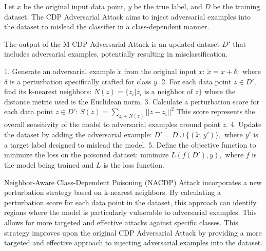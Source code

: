 Let \( x \) be the original input data point, \( y \) be the true label, and \( D \) be the training dataset. The CDP Adversarial Attack aims to inject adversarial examples into the dataset to mislead the classifier in a class-dependent manner.

The output of the M-CDP Adversarial Attack is an updated dataset \( D' \) that includes adversarial examples, potentially resulting in misclassification.

1. Generate an adversarial example \( \tilde{x} \) from the original input \( x \):
   $
   \tilde{x} = x + \delta,
   $
   where \( \delta \) is a perturbation specifically crafted for class \( y \).
2. For each data point \( z \in D' \), find its k-nearest neighbors:
   $
   N(z) = \{z_i | z_i \text{ is a neighbor of } z\}
   $
   where the distance metric used is the Euclidean norm.
3. Calculate a perturbation score for each data point \( z \in D' \):
   $
   S(z) = \sum_{z_i \in N(z)} ||z - z_i||^2
   $
   This score represents the overall sensitivity of the model to adversarial examples around point \( z \).
4. Update the dataset by adding the adversarial example:
   $
   D' = D \cup \{(\tilde{x}, y')\},
   $
   where \( y' \) is a target label designed to mislead the model.
5. Define the objective function to minimize the loss on the poisoned dataset:
   $
   \text{minimize } L(f(D'), y),
   $
   where \( f \) is the model being trained and \( L \) is the loss function.

Neighbor-Aware Class-Dependent Poisoning (NACDP) Attack incorporates a new perturbation strategy based on k-nearest neighbors. By calculating a perturbation score for each data point in the dataset, this approach can identify regions where the model is particularly vulnerable to adversarial examples. This allows for more targeted and effective attacks against specific classes.
This strategy improves upon the original CDP Adversarial Attack by providing a more targeted and effective approach to injecting adversarial examples into the dataset.